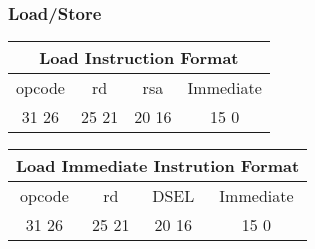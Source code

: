 \documentclass[letterpaper, 11pt]{article}
\begin{document}
\subsubsection{Load/Store}
\begin{center}
		\begin{tabular}{|c|c|c|c|}
			\multicolumn{4}{c}{Load Instruction Format}\\ \hline
				\hspace{2pt} opcode \hspace{2pt} & \hspace{5pt} rd \hspace{5pt} &  \hspace{4pt} rsa \hspace{4pt} & \hspace{10pt} Immediate \hspace{10pt}   \\	\hline
			31 \hfill 26& 25 \hfill 21 &20 \hfill  16& 15 \hfill 0\\ \hline
		
	\end{tabular}
\end{center}
\vspace{0.5cm}
\begin{center}
		\begin{tabular}{|c|c|c|c|}
				\multicolumn{4}{c}{Load Immediate Instrution Format}\\ \hline
				\hspace{2pt} opcode \hspace{2pt} & \hspace{5pt} rd \hspace{5pt} &  \hspace{4pt} DSEL \hspace{4pt} & \hspace{10pt}Immediate  \hspace{10pt}   \\	\hline
			31 \hfill 26& 25 \hfill 21 &20 \hfill  16& 15  \hfill   0\\ \hline
		
	\end{tabular}
\end{center}
\vspace{0.5cm}
\end{document}
